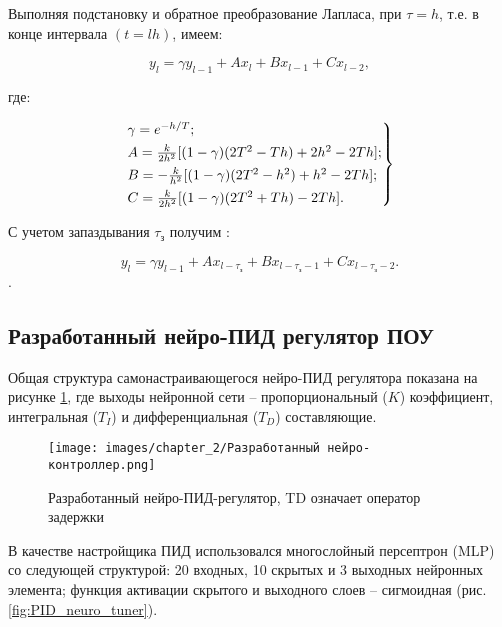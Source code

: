 Выполняя подстановку и обратное преобразование Лапласа, при $\tau = h$, т.е. в конце интервала $(t = lh)$, имеем:

\begin{equation}
    y_l = \gamma y_{l - 1} + Ax_l + Bx_{l - 1} + Cx_{l - 2},
\end{equation}

где:

\begin{equation}
    \begin{rcases}
        \gamma = e^{-h/T};\\
        A = \frac{k}{2h^2}[(1 - \gamma)(2T^2 - Th) + 2h^2 - 2Th];\\
        B = -\frac{k}{h^2}[(1 - \gamma)(2T^2 - h^2) + h^2 - 2Th];\\
        C = \frac{k}{2h^2}[(1 - \gamma)(2T^2 + Th) - 2Th].
    \end{rcases}
\end{equation}

С учетом запаздывания $\tau_\text{з}$ получим \cite{Нетушил1978}:

\begin{equation}
    y_l = \gamma y_{l - 1} + Ax_{l - \tau_\text{з}} + Bx_{l - \tau_\text{з} - 1} + Cx_{l - \tau_\text{з} - 2}.
\end{equation}.

\subsection{Разработанный нейро-ПИД регулятор ПОУ}

Общая структура самонастраивающегося нейро-ПИД регулятора показана на рисунке \ref{fig:neuro_PID_controller}, где выходы нейронной сети – пропорциональный ($K$) коэффициент, интегральная ($T_I$) и дифференциальная ($T_D$) составляющие.

\begin{figure}[H]
    \centering
    \texttt{[image: images/chapter\_2/Разработанный нейро-контроллер.png]}
    \caption{Разработанный нейро-ПИД-регулятор, TD означает оператор задержки}
    \label{fig:neuro_PID_controller}
\end{figure}

В качестве настройщика ПИД использовался многослойный персептрон (MLP) со следующей структурой: 20 входных, 10 скрытых и 3 выходных нейронных элемента; функция активации скрытого и выходного слоев – сигмоидная (рис. \ref{fig:PID_neuro_tuner}).

